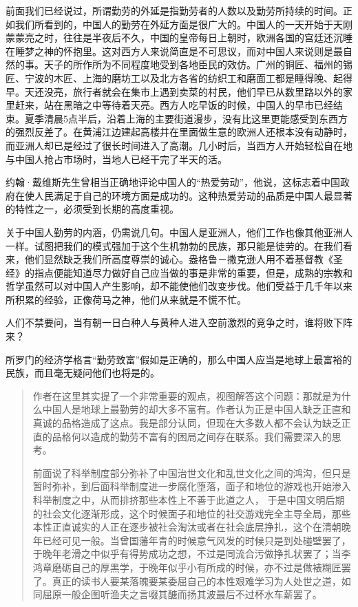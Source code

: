 \documentclass[12pt,oneside]{book}
\begin{document}
\begin{common-format}
前面我们已经说过，所谓勤劳的外延是指勤劳者的人数以及勤劳所持续的时间。正如我们所看到的，中国人的勤劳在外延方面是很广大的。中国人的一天开始于天刚蒙蒙亮之时，往往是半夜后不久，中国的皇帝每日上朝时，欧洲各国的宫廷还沉睡在睡梦之神的怀抱里。这对西方人来说简直是不可思议，而对中国人来说则是最自然的事。天子的所作所为不同程度地受到各地臣民的效仿。广州的铜匠、福州的锡匠、宁波的木匠、上海的磨坊工以及北方各省的纺织工和磨面工都是睡得晚、起得早。天还没亮，旅行者就会在集市上遇到卖菜的村民，他们早已从数里路以外的家里赶来，站在黑暗之中等待着天亮。西方人吃早饭的时候，中国人的早市已经结束。夏季清晨5点半后，沿着上海的主要街道漫步，没有比这里更能感受到东西方的强烈反差了。在黄浦江边建起高楼并在里面做生意的欧洲人还根本没有动静时，而亚洲人却已是经过了很长时间进入了高潮。几小时后，当西方人开始轻松自在地与中国人抢占市场时，当地人已经干完了半天的活。 

约翰·戴维斯先生曾相当正确地评论中国人的“热爱劳动”，他说，这标志着中国政府在使人民满足于自己的环境方面是成功的。这种热爱劳动的品质是中国人最显著的特性之一，必须受到长期的高度重视。 

关于中国人勤劳的内涵，仍需说几句。中国人是亚洲人，他们工作也像其他亚洲人一样。试图把我们的模式强加于这个生机勃勃的民族，那只能是徒劳的。在我们看来，他们显然缺乏我们所高度尊崇的诚心。盎格鲁－撒克逊人用不着基督教《圣经》的指点便能知道尽力做好自己应当做的事是非常的重要，但是，成熟的宗教和哲学虽然可以对中国人产生影响，却不能使他们改变步伐。他们受益于几千年以来所积累的经验，正像荷马之神，他们从来就是不慌不忙。 

人们不禁要问，当有朝一日白种人与黄种人进入空前激烈的竞争之时，谁将败下阵来？ 

所罗门的经济学格言“勤劳致富”假如是正确的，那么中国人应当是地球上最富裕的民族，而且毫无疑问他们也将是的。

\begin{quotation}
作者在这里其实提了一个非常重要的观点，视图解答这个问题：那就是为什么中国人是地球上最勤劳的却大多不富有。作者认为正是中国人缺乏正直和真诚的品格造成了这点。我是部分认同，但现在大多数人都不会认为缺乏正直的品格何以造成的勤劳不富有的困局之间存在联系。我们需要深入的思考。

前面说了科举制度部分弥补了中国治世文化和乱世文化之间的鸿沟，但只是暂时弥补，到后面科举制度进一步腐化堕落，面子和地位的游戏也开始渗入科举制度之中，从而排挤那些本性上不善于此道之人， 于是中国文明后期的社会文化逐渐形成，这个时候面子和地位的社交游戏完全主导全局，那些本性正直诚实的人正在逐步被社会淘汰或者在社会底层挣扎，这个在清朝晚年已经可见一般。当曾国藩年青的时候意气风发的时候只是到处碰壁罢了，于晚年老滑之中似乎有得势成功之想，不过是同流合污做挣扎状罢了；当李鸿章磨砺自己的厚黑学，于晚年似乎小有所成的时候，亦不过是做裱糊匠罢了。真正的读书人要某落魄要某委屈自己的本性艰难学习为人处世之道，如同屈原一般企图听渔夫之言啜其醣而扬其波最后不过杯水车薪罢了。


\end{quotation}
\end{common-format}
\end{document}
